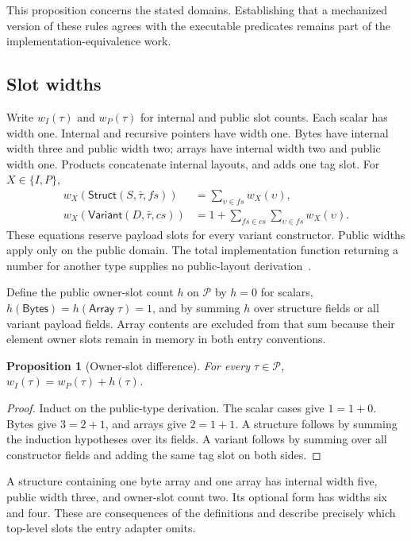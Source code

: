 \documentclass[11pt]{article}
\newcommand{\code}[1]{\texttt{\seqsplit{#1}}}
\newcommand{\ty}[1]{\mathsf{#1}}
\newcommand{\Pp}{\mathcal{P}}
\newtheorem{proposition}[definition]{Proposition}
\begin{document}
This proposition concerns the stated domains.  Establishing that a mechanized version of these rules agrees with the executable predicates remains part of the implementation-equivalence work.

\subsection{Slot widths}

Write $w_I(\tau)$ and $w_P(\tau)$ for internal and public slot counts.  Each scalar has width one.  Internal \code{Unit} and recursive pointers have width one.  Bytes have internal width three and public width two; arrays have internal width two and public width one.  Products concatenate internal layouts, and \code{PSum} adds one tag slot.  For $X\in\{I,P\}$,
\begin{align*}
w_X(\ty{Struct}(S,\bar\tau,fs))&=\sum_{\upsilon\in fs}w_X(\upsilon),\\
w_X(\ty{Variant}(D,\bar\tau,cs))&=1+\sum_{fs\in cs}\sum_{\upsilon\in fs}w_X(\upsilon).
\end{align*}
These equations reserve payload slots for every variant constructor.  Public widths apply only on the public domain.  The total implementation function \code{abiSlots} returning a number for another type supplies no public-layout derivation~\cite{types}.

Define the public owner-slot count $h$ on $\Pp$ by $h=0$ for scalars, $h(\ty{Bytes})=h(\ty{Array}\;\tau)=1$, and by summing $h$ over structure fields or all variant payload fields.  Array contents are excluded from that sum because their element owner slots remain in memory in both entry conventions.

\begin{proposition}[Owner-slot difference]
For every $\tau\in\Pp$, $w_I(\tau)=w_P(\tau)+h(\tau)$.
\end{proposition}
\begin{proof}
Induct on the public-type derivation.  The scalar cases give $1=1+0$.  Bytes give $3=2+1$, and arrays give $2=1+1$.  A structure follows by summing the induction hypotheses over its fields.  A variant follows by summing over all constructor fields and adding the same tag slot on both sides.
\end{proof}

A structure containing one byte array and one array has internal width five, public width three, and owner-slot count two.  Its optional form has widths six and four.  These are consequences of the definitions and describe precisely which top-level slots the entry adapter omits.
\end{document}
